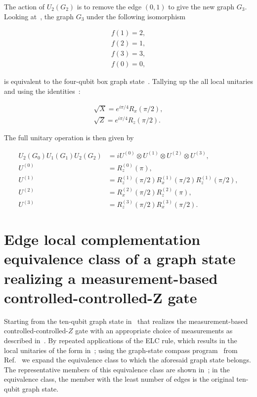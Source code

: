 \noindent
The action of $U_2(G_2)$ is to remove the edge $(0,1)$ to give the new graph $G_3$. Looking at~, the graph $G_3$ under the following isomorphism

\begin{align}
    f(1) = 2,  \nonumber \\
    f(2) = 1, \nonumber \\
    f(3) = 3, \nonumber \\
    f(0) = 0,
\end{align}

\noindent
is equivalent to the four-qubit box graph state~. Tallying up the all local unitaries and using the identities~\cite{Soeken_2013}:

\begin{align}
	\sqrt{X} = e^{i\pi/4} R_x(\pi/2), \nonumber \\
	\sqrt{Z} = e^{i\pi/4} R_z(\pi/2).
\end{align}

\noindent
The full unitary operation is then given by

\begin{align}
	U_2(G_0)U_1(G_1)U_2(G_2) &= i U^{(0)}\otimes U^{(1)} \otimes U^{(2)} \otimes U^{(3)}, \nonumber \\ 
	U^{(0)} &= R^{(0)}_z(\pi), \nonumber \\
	U^{(1)} &= R^{(1)}_z(\pi/2) R^{(1)}_x(\pi/2) R^{(1)}_z(\pi/2), \nonumber \\
	U^{(2)} &= R^{(2)}_x(\pi/2)R^{(2)}_z(\pi), \nonumber \\
	U^{(3)} &= R^{(3)}_z(\pi/2)R^{(3)}_x(\pi/2).
\end{align}

\clearpage

\section{Edge local complementation equivalence class of a graph state realizing a measurement-based controlled-controlled-Z gate}

Starting from the ten-qubit graph state in~ that realizes the measurement-based controlled-controlled-$Z$ gate with an appropriate choice of measurements as described in~. By repeated applications of the \acs{ELC} rule, which results in the local unitaries of the form in~; using the graph-state compass program~\cite{Sammorley_2019} from Ref.~\cite{Adcock_2020} we expand the equivalence class to which the aforesaid graph state belongs. The representative members of this equivalence class are shown in~; in the equivalence class, the member with the least number of edges is the original ten-qubit graph state.

